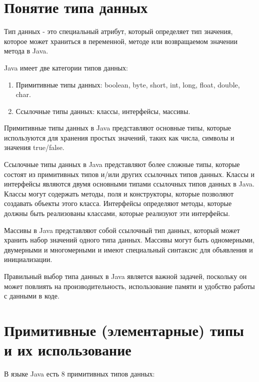 \section{Понятие типа данных}

Тип данных - это специальный атрибут, который определяет тип значения, которое может храниться в переменной, методе или возвращаемом значении метода в Java.

Java имеет две категории типов данных:
\begin{enumerate}
    \item Примитивные типы данных: boolean, byte, short, int, long, float, double, char.
    \item Ссылочные типы данных: классы, интерфейсы, массивы.
\end{enumerate}

Примитивные типы данных в Java представляют основные типы, которые используются для хранения простых значений, таких как числа, символы и значения true/false.

Ссылочные типы данных в Java представляют более сложные типы, которые состоят из примитивных типов и/или других ссылочных типов данных. Классы и интерфейсы являются двумя основными типами ссылочных типов данных в Java. Классы могут содержать методы, поля и конструкторы, которые позволяют создавать объекты этого класса. Интерфейсы определяют методы, которые должны быть реализованы классами, которые реализуют эти интерфейсы.

Массивы в Java представляют собой ссылочный тип данных, который может хранить набор значений одного типа данных. Массивы могут быть одномерными, двумерными и многомерными и имеют специальный синтаксис для объявления и инициализации.

Правильный выбор типа данных в Java является важной задачей, поскольку он может повлиять на производительность, использование памяти и удобство работы с данными в коде.

\section{Примитивные (элементарные) типы и их использование}

В языке Java есть 8 примитивных типов данных:

